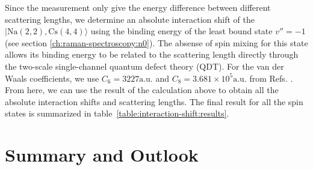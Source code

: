 Since the measurement only give the energy difference between different scattering lengths,
we determine an absolute interaction shift of the $|\mathrm{Na(2, 2),Cs(4, 4)}\rangle$
using the binding energy of the least bound state $v''=-1$
(see section \ref{ch:raman-spectroscopy:n0}).
The absense of spin mixing for this state allows its binding energy to be related
to the scattering length directly through
the two-scale single-channel quantum defect theory (QDT).
For the van der Waals coefficients, we use $C_6=3227\mathrm{a.u.}$ and
$C_8=3.681\times10^5\mathrm{a.u.}$ from
Refs. \cite{docenko_coupling_2006,mcguyer_high-precision_2015,porsev_accurate_2003}.
From here, we can use the result of the calculation above to obtain all the
absolute interaction shifts and scattering lengths.
The final result for all the spin states is summarized in
table~\ref{table:interaction-shift:results}.

\section{Summary and Outlook}

